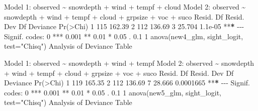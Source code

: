 \documentclass[
]{article}
\newenvironment{Shaded}{\begin{snugshade}}{\end{snugshade}}
\newcommand{\AttributeTok}[1]{\textcolor[rgb]{0.77,0.63,0.00}{#1}}
\newcommand{\DecValTok}[1]{\textcolor[rgb]{0.00,0.00,0.81}{#1}}
\newcommand{\ErrorTok}[1]{\textcolor[rgb]{0.64,0.00,0.00}{\textbf{#1}}}
\newcommand{\FloatTok}[1]{\textcolor[rgb]{0.00,0.00,0.81}{#1}}
\newcommand{\FunctionTok}[1]{\textcolor[rgb]{0.00,0.00,0.00}{#1}}
\newcommand{\NormalTok}[1]{#1}
\newcommand{\SpecialCharTok}[1]{\textcolor[rgb]{0.00,0.00,0.00}{#1}}
\newcommand{\StringTok}[1]{\textcolor[rgb]{0.31,0.60,0.02}{#1}}
\begin{document}
\begin{Shaded}
\begin{Highlighting}[]
\NormalTok{Model }\DecValTok{1}\SpecialCharTok{:}\NormalTok{ observed }\SpecialCharTok{\textasciitilde{}}\NormalTok{ snowdepth }\SpecialCharTok{+}\NormalTok{ wind }\SpecialCharTok{+}\NormalTok{ tempf }\SpecialCharTok{+}\NormalTok{ cloud}
\NormalTok{Model }\DecValTok{2}\SpecialCharTok{:}\NormalTok{ observed }\SpecialCharTok{\textasciitilde{}}\NormalTok{ snowdepth }\SpecialCharTok{+}\NormalTok{ wind }\SpecialCharTok{+}\NormalTok{ tempf }\SpecialCharTok{+}\NormalTok{ cloud }\SpecialCharTok{+}\NormalTok{ grpsize }\SpecialCharTok{+}\NormalTok{ voc }\SpecialCharTok{+} 
\NormalTok{    suco}
\NormalTok{  Resid. Df Resid. Dev Df Deviance }\FunctionTok{Pr}\NormalTok{(}\SpecialCharTok{\textgreater{}}\NormalTok{Chi)    }
\DecValTok{1}       \DecValTok{115}     \FloatTok{162.39}                         
\DecValTok{2}       \DecValTok{112}     \FloatTok{136.69}  \DecValTok{3}   \FloatTok{25.704}  \FloatTok{1.1e{-}05} \SpecialCharTok{**}\ErrorTok{*}
\SpecialCharTok{{-}{-}{-}}
\NormalTok{Signif. codes}\SpecialCharTok{:}  \DecValTok{0} \StringTok{\textquotesingle{}***\textquotesingle{}} \FloatTok{0.001} \StringTok{\textquotesingle{}**\textquotesingle{}} \FloatTok{0.01} \StringTok{\textquotesingle{}*\textquotesingle{}} \FloatTok{0.05} \StringTok{\textquotesingle{}.\textquotesingle{}} \FloatTok{0.1} \StringTok{\textquotesingle{} \textquotesingle{}} \DecValTok{1}
\FunctionTok{anova}\NormalTok{(new4\_glm, sight\_logit, }\AttributeTok{test=}\StringTok{"Chisq"}\NormalTok{)}
\NormalTok{Analysis of Deviance Table}

\NormalTok{Model }\DecValTok{1}\SpecialCharTok{:}\NormalTok{ observed }\SpecialCharTok{\textasciitilde{}}\NormalTok{ snowdepth }\SpecialCharTok{+}\NormalTok{ wind }\SpecialCharTok{+}\NormalTok{ tempf}
\NormalTok{Model }\DecValTok{2}\SpecialCharTok{:}\NormalTok{ observed }\SpecialCharTok{\textasciitilde{}}\NormalTok{ snowdepth }\SpecialCharTok{+}\NormalTok{ wind }\SpecialCharTok{+}\NormalTok{ tempf }\SpecialCharTok{+}\NormalTok{ cloud }\SpecialCharTok{+}\NormalTok{ grpsize }\SpecialCharTok{+}\NormalTok{ voc }\SpecialCharTok{+} 
\NormalTok{    suco}
\NormalTok{  Resid. Df Resid. Dev Df Deviance  }\FunctionTok{Pr}\NormalTok{(}\SpecialCharTok{\textgreater{}}\NormalTok{Chi)    }
\DecValTok{1}       \DecValTok{119}     \FloatTok{165.35}                          
\DecValTok{2}       \DecValTok{112}     \FloatTok{136.69}  \DecValTok{7}   \FloatTok{28.666} \FloatTok{0.0001665} \SpecialCharTok{**}\ErrorTok{*}
\SpecialCharTok{{-}{-}{-}}
\NormalTok{Signif. codes}\SpecialCharTok{:}  \DecValTok{0} \StringTok{\textquotesingle{}***\textquotesingle{}} \FloatTok{0.001} \StringTok{\textquotesingle{}**\textquotesingle{}} \FloatTok{0.01} \StringTok{\textquotesingle{}*\textquotesingle{}} \FloatTok{0.05} \StringTok{\textquotesingle{}.\textquotesingle{}} \FloatTok{0.1} \StringTok{\textquotesingle{} \textquotesingle{}} \DecValTok{1}
\FunctionTok{anova}\NormalTok{(new5\_glm, sight\_logit, }\AttributeTok{test=}\StringTok{"Chisq"}\NormalTok{)}
\NormalTok{Analysis of Deviance Table}


\end{Highlighting}
\end{Shaded}
\end{document}
